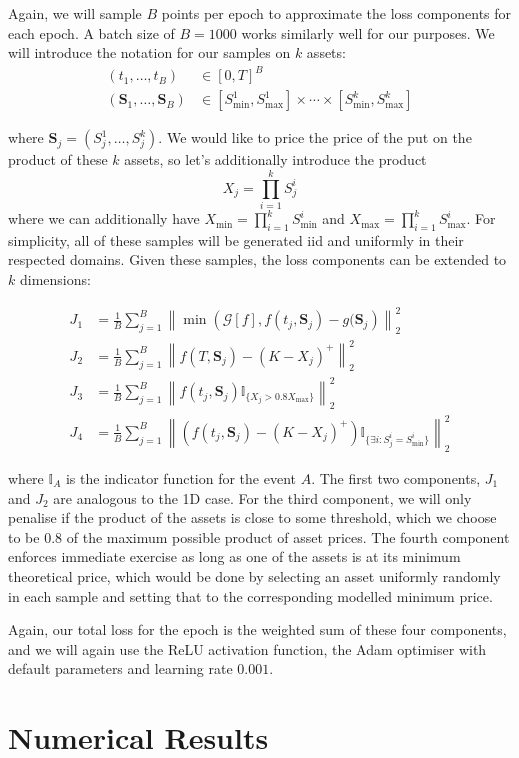 Again, we will sample $B$ points per epoch to approximate the loss components for each epoch. A batch size of $B=1000$ works similarly well for our purposes. We will introduce the notation for our samples on $k$ assets:
\begin{align*}
    (t_1, \dots, t_B) &\in [0, T]^B\\
    (\bm S_1, \dots, \bm S_B) &\in [S^1_\text{min}, S^1_\text{max}]\times \cdots \times [S^k_\text{min}, S^k_\text{max}]
\end{align*}

where $\bm S_j = (S_j^1, \dots, S_j^k)$. We would like to price the price of the put on the product of these $k$ assets, so let's additionally introduce the product
$$X_j = \prod_{i=1}^k S_j^i$$
where we can additionally have $X_\text{min} = \prod_{i=1}^k S_\text{min}^i$ and $X_\text{max} = \prod_{i=1}^k S_\text{max}^i$.
For simplicity, all of these samples will be generated iid and uniformly in their respected domains. Given these samples, the loss components can be extended to $k$ dimensions:

\begin{align*}
    J_1 &= \frac{1}{B} \sum_{j=1}^B \left\| \min \left(\mathcal G[f], f(t_j, \bm S_j) - g(\bm S_j\right)\right\|_2^2 \\
    J_2 &= \frac 1B \sum_{j=1}^B \left\| f(T, \bm S_j) - (K - X_j)^+\right\|_2^2 \\
    J_3 &= \frac 1B \sum_{j=1}^B \left\| 
    f(t_j, \bm S_j) \mathbb I_{\{X_j > 0.8X_\text{max}\}} \right\|_2^2 \\
    J_4 &= \frac 1B \sum_{j=1}^B \left\|\left( f(t_j, \bm S_j) - (K - X_j)^+\right)\mathbb I_{\{\exists i : S^i_j = S^i_\text{min}\}}\right\|_2^2
\end{align*}

where $\mathbb I_{A}$ is the indicator function for the event $A$. The first two components, $J_1$ and $J_2$ are analogous to the 1D case. For the third component, we will only penalise if the product of the assets is close to some threshold, which we choose to be $0.8$ of the maximum possible product of asset prices. The fourth component enforces immediate exercise as long as one of the assets is at its minimum theoretical price, which would be done by selecting an asset uniformly randomly in each sample and setting that to the corresponding modelled minimum price.

Again, our total loss for the epoch is the weighted sum of these four components, and we will again use the ReLU activation function, the Adam optimiser with default parameters and learning rate $0.001$.

\section{Numerical Results}

